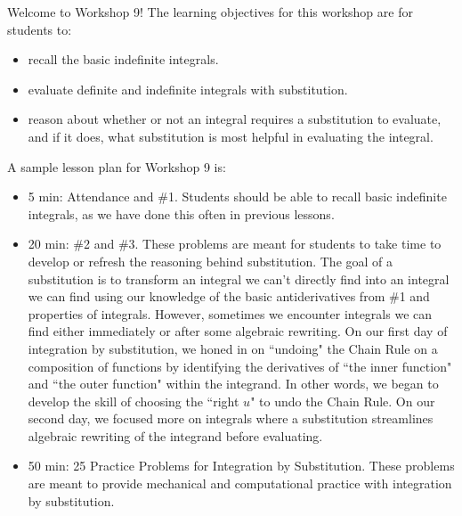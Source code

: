\documentclass{article}
\begin{document}
\begin{workshop}
    Welcome to Workshop 9! The learning objectives for this workshop are for students to:
    \begin{itemize}
    \item recall the basic indefinite integrals.
    \item evaluate definite and indefinite integrals with substitution.
    \item reason about whether or not an integral requires a substitution to evaluate, and if it does, what substitution is most helpful in evaluating the integral.
    \end{itemize}
 A sample lesson plan for Workshop 9 is:
 \begin{itemize}
     \item  5 min: Attendance and \#1. Students should be able to recall basic indefinite integrals, as we have done this often in previous lessons.
     \item 20 min: \#2 and \#3. These problems are meant for students to take time to develop or refresh the reasoning behind substitution. The goal of a substitution is to transform an integral we can't directly find into an integral we can find using our knowledge of the basic antiderivatives from \#1 and properties of integrals. However, sometimes we encounter integrals we can find either immediately or after some algebraic rewriting. On our first day of integration by substitution, we honed in on ``undoing" the Chain Rule on a composition of functions by identifying the derivatives of ``the inner function" and ``the outer function" within the integrand. In other words, we began to develop the skill of choosing the ``right $u$" to undo the Chain Rule. On our second day, we focused more on integrals where a substitution streamlines algebraic rewriting of the integrand before evaluating.
     \item 50 min: 25 Practice Problems for Integration by Substitution. These problems are meant to provide mechanical and computational practice with integration by substitution. 
 \end{itemize}

    
\end{workshop}
\end{document}
